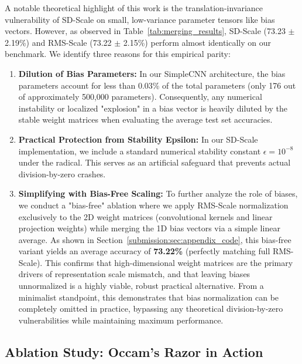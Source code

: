 A notable theoretical highlight of this work is the translation-invariance vulnerability of SD-Scale on small, low-variance parameter tensors like bias vectors. However, as observed in Table~\ref{tab:merging_results}, SD-Scale (73.23 $\pm$ 2.19\%) and RMS-Scale (73.22 $\pm$ 2.15\%) perform almost identically on our benchmark. We identify three reasons for this empirical parity:
\begin{enumerate}
    \item \textbf{Dilution of Bias Parameters:} In our SimpleCNN architecture, the bias parameters account for less than 0.03\% of the total parameters (only 176 out of approximately 500,000 parameters). Consequently, any numerical instability or localized "explosion" in a bias vector is heavily diluted by the stable weight matrices when evaluating the average test set accuracies.
    \item \textbf{Practical Protection from Stability Epsilon:} In our SD-Scale implementation, we include a standard numerical stability constant $\epsilon = 10^{-8}$ under the radical. This serves as an artificial safeguard that prevents actual division-by-zero crashes.
    \item \textbf{Simplifying with Bias-Free Scaling:} To further analyze the role of biases, we conduct a "bias-free" ablation where we apply RMS-Scale normalization exclusively to the 2D weight matrices (convolutional kernels and linear projection weights) while merging the 1D bias vectors via a simple linear average. As shown in Section~\ref{submission:sec:appendix_code}, this bias-free variant yields an average accuracy of \textbf{73.22\%} (perfectly matching full RMS-Scale). This confirms that high-dimensional weight matrices are the primary drivers of representation scale mismatch, and that leaving biases unnormalized is a highly viable, robust practical alternative. From a minimalist standpoint, this demonstrates that bias normalization can be completely omitted in practice, bypassing any theoretical division-by-zero vulnerabilities while maintaining maximum performance.
\end{enumerate}

\subsection{Ablation Study: Occam's Razor in Action}

